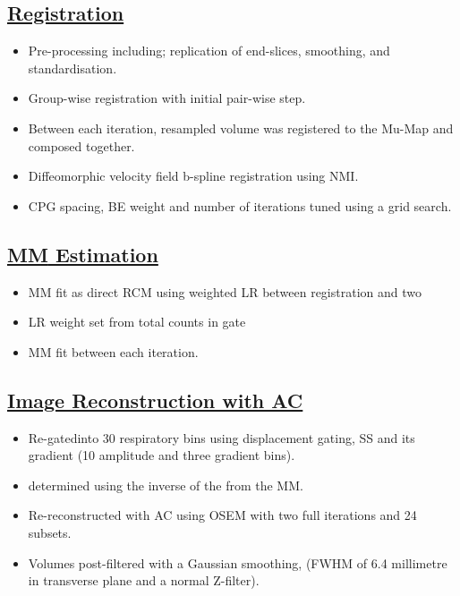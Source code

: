 \documentclass[portrait, color=UCLburgundy, margin=1cm]{uclposter}
\begin{document}
\begin{multicols}{3}
            \subsection*{\underline{\textbf{Registration}}}
                \begin{itemize}
                    \item Pre-processing including; replication of end-slices, smoothing, and standardisation.
                    \item Group-wise registration with initial pair-wise step.
                    \item Between each iteration, resampled volume was registered to the \gls{Mu-Map} and  composed together.
                    \item Diffeomorphic velocity field b-spline registration using \gls{NMI}.
                    \item \acrlong{CPG} spacing, \acrlong{BE} weight and number of iterations tuned using a grid search.
                \end{itemize}
            
            \subsection*{\underline{\textbf{\acrlong{MM} Estimation}}}
                \begin{itemize}
                    \item \gls{MM} fit as direct \acrlong{RCM} using weighted \gls{LR} between registration  and two 
                    \item \gls{LR} weight set from total counts in gate
                    \item \gls{MM} fit between each iteration.
                \end{itemize}
            
            \subsection*{\underline{\textbf{Image Reconstruction with AC}}}
                \begin{itemize}
                    \item Re-gatedinto 30 respiratory bins using displacement gating, \gls{SS} and its gradient (10 amplitude and three gradient bins).
                    \item {} determined using the inverse of the  from the \gls{MM}.
                    \item Re-reconstructed with \gls{AC} using \gls{OSEM} with two full iterations and 24 subsets.
                    \item Volumes post-filtered with a Gaussian smoothing, (\gls{FWHM} of 6.4 millimetre in transverse plane and a normal Z-filter).
                \end{itemize}
            

\end{multicols}
\end{document}
